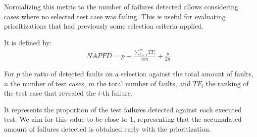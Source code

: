 Normalizing this metric to the number of failures detected allows considering cases where no
selected test case was failing. This is useful for evaluating prioritizations that had previously some selection criteria applied.

It is defined by:
\begin{align*}
NAPFD = p - \frac{\sum_{i=1}^mTF_i}{nm} + \frac{p}{2n}
\end{align*}

For $p$ the ratio of detected faults on a selection against the total amount of faults,
$n$ the number of test cases, $m$ the total number of faults, and $TF_i$ the ranking of
the test case that revealed the $i$-th failure.

It represents the proportion of the test failures detected against each executed test.
We aim for this value to be close to 1, representing that the accumulated amount of 
failures detected is obtained early with the prioritization.